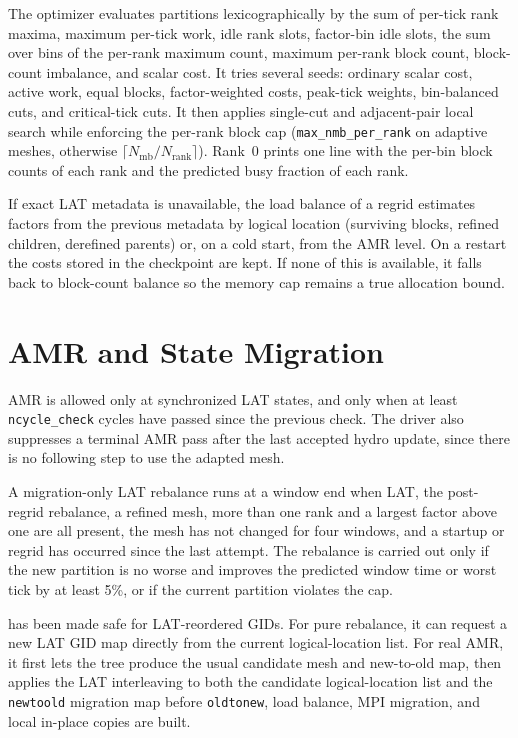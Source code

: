\documentclass[11pt]{article}
\begin{document}
The optimizer evaluates partitions lexicographically by the sum of per-tick rank
maxima, maximum per-tick work, idle rank slots, factor-bin idle slots, the sum
over bins of the per-rank maximum count, maximum per-rank block count,
block-count imbalance, and scalar cost.  It tries several seeds: ordinary scalar
cost, active work, equal blocks, factor-weighted costs, peak-tick weights,
bin-balanced cuts, and critical-tick cuts.  It then applies single-cut and
adjacent-pair local search while enforcing the per-rank block cap
(\texttt{max\_nmb\_per\_rank} on adaptive meshes, otherwise
\(\lceil N_{\mathrm{mb}}/N_{\mathrm{rank}}\rceil\)).  Rank~0 prints one line with
the per-bin block counts of each rank and the predicted busy fraction of each
rank.

If exact LAT metadata is unavailable, the load balance of a regrid estimates
factors from the previous metadata by logical location (surviving blocks,
refined children, derefined parents) or, on a cold start, from the AMR level.
On a restart the costs stored in the checkpoint are kept.  If none of this is
available, it falls back to block-count balance so the memory cap remains a true
allocation bound.

\section{AMR and State Migration}
\label{sec:amr}

AMR is allowed only at synchronized LAT states, and only when at least
\texttt{ncycle\_check} cycles have passed since the previous check.  The driver
also suppresses a terminal AMR pass after the last accepted hydro update, since
there is no following step to use the adapted mesh.

A migration-only LAT rebalance runs at a window end when LAT, the post-regrid
rebalance, a refined mesh, more than one rank and a largest factor above one are
all present, the mesh has not changed for four windows, and a startup or regrid
has occurred since the last attempt.  The rebalance is carried out only if the
new partition is no worse and improves the predicted window time or worst tick
by at least 5\%, or if the current partition violates the cap.

 has been made safe for
LAT-reordered GIDs.  For pure rebalance, it can request a new LAT GID map
directly from the current logical-location list.  For real AMR, it first lets
the tree produce the usual candidate mesh and new-to-old map, then applies the
LAT interleaving to both the candidate logical-location list and the
\texttt{newtoold} migration map before \texttt{oldtonew}, load balance, MPI
migration, and local in-place copies are built.
\end{document}
